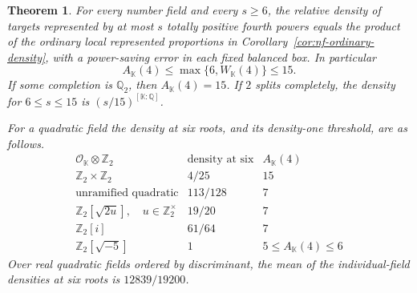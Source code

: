 \documentclass[11pt,letterpaper]{article}
\newtheorem{theorem}{Theorem}[section]
\theoremstyle{definition}
\numberwithin{equation}{section}
\begin{document}
\begin{theorem}\label{thm:nf-six-quartics}
For every number field and every $s\ge6$, the relative density of
targets represented by at most $s$ totally positive fourth powers
equals the product of the ordinary local represented proportions
in Corollary~\ref{cor:nf-ordinary-density}, with a power-saving
error in each fixed balanced box. In particular
\[
 A_{\mathbb K}(4)\le\max\{6,W_{\mathbb K}(4)\}\le15 .
\]
If some completion is $\mathbb Q_2$, then $A_{\mathbb K}(4)=15$.
If $2$ splits completely, the density for $6\le s\le15$ is
$(s/15)^{[\mathbb K:\mathbb Q]}$.

For a quadratic field the density at six roots, and its density-one
threshold, are as follows.
\[
\begin{array}{c|c|c}
 \mathcal O_{\mathbb K}\otimes\mathbb Z_2 &
  \text{density at six}& A_{\mathbb K}(4)\\\hline
 \mathbb Z_2\times\mathbb Z_2 & 4/25&15\\
 \text{unramified quadratic} &113/128&7\\
 \mathbb Z_2[\sqrt{2u}],\quad u\in\mathbb Z_2^\times &19/20&7\\
 \mathbb Z_2[i]&61/64&7\\
 \mathbb Z_2[\sqrt{-5}]&1&5\le A_{\mathbb K}(4)\le6
\end{array}
\]
Over real quadratic fields ordered by discriminant, the mean of
the individual-field densities at six roots is $12839/19200$.
\end{theorem}
\end{document}
